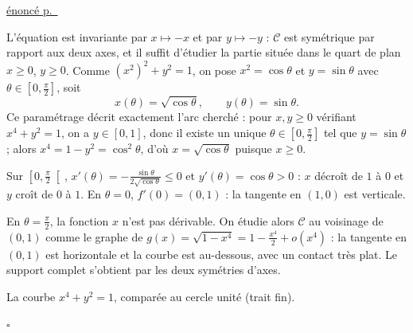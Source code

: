 \documentclass[a4paper,11pt]{article}
\numberwithin{equation}{section}
\numberwithin{figure}{section}
\numberwithin{table}{section}
\theoremstyle{enonce}
\theoremstyle{exemple}
\theoremstyle{remarque}
\newenvironment{corrige}[1]{%
  \par\needspace{6\baselineskip}\vspace{1em}\phantomsection\label{c:#1}%
  \noindent{\sffamily\bfseries\color{Bleu}Exercice~\ref{e:#1}}\quad
  {\scriptsize\sffamily\hyperref[e:#1]{\color{Gris}énoncé p.~\pageref{e:#1}}}\par\nobreak\vspace{0.2em}}%
  {\hfill\textcolor{BleuClair}{$\square$}\par}
\begin{document}
\begin{corrige}{rec-x4}
L'équation est invariante par $x\mapsto-x$ et par $y\mapsto-y$ : $\mathcal C$ est symétrique par rapport aux deux axes, et
il suffit d'étudier la partie située dans le quart de plan $x\geq0$, $y\geq0$. Comme $(x^2)^2+y^2=1$, on pose
$x^2=\cos\theta$ et $y=\sin\theta$ avec $\theta\in\left[0,\frac\pi2\right]$, soit
\[x(\theta)=\sqrt{\cos\theta},\qquad y(\theta)=\sin\theta.\]
Ce paramétrage décrit exactement l'arc cherché : pour $x,y\geq0$ vérifiant $x^4+y^2=1$, on a $y\in[0,1]$, donc il existe
un unique $\theta\in\left[0,\frac\pi2\right]$ tel que $y=\sin\theta$ ; alors $x^4=1-y^2=\cos^2\theta$, d'où
$x=\sqrt{\cos\theta}$ puisque $x\geq0$.

Sur $\left[0,\frac\pi2\right[$, $x'(\theta)=-\frac{\sin\theta}{2\sqrt{\cos\theta}}\leq0$ et $y'(\theta)=\cos\theta>0$ :
$x$ décroît de $1$ à $0$ et $y$ croît de $0$ à $1$. En $\theta=0$, $f'(0)=(0,1)$ : la tangente en $(1,0)$ est verticale.

En $\theta=\frac\pi2$, la fonction $x$ n'est pas dérivable. On étudie alors $\mathcal C$ au voisinage de $(0,1)$ comme le
graphe de $g(x)=\sqrt{1-x^4}=1-\frac{x^4}2+o(x^4)$ : la tangente en $(0,1)$ est horizontale et la courbe est au-dessous,
avec un contact très plat. Le support complet s'obtient par les deux symétries d'axes.
\begin{center}

{\small\color{Gris}La courbe $x^4+y^2=1$, comparée au cercle unité (trait fin).}
\end{center}
\end{corrige}
\end{document}
